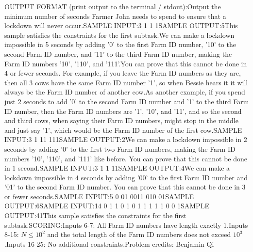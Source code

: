 \documentclass[12pt]{article}
\begin{document}
OUTPUT FORMAT (print output to the terminal / stdout):Output the minimum number of seconds Farmer John needs to spend to ensure that a
lockdown will never occur.SAMPLE INPUT:3
1
1
1SAMPLE OUTPUT:5This sample satisfies the constraints for the first subtask.We can make a lockdown impossible in 5 seconds by adding '0' to the first Farm
ID number, '10' to the second Farm ID number, and '11' to the third Farm ID
number, making the Farm ID numbers '10', '110', and '111'.You can prove that this cannot be done in 4 or fewer seconds. For example, if
you leave the Farm ID numbers as they are, then all 3 cows have the same Farm ID
number '1', so when Bessie hears it it will always be the Farm ID number of
another cow.As another example, if you spend just 2 seconds to add '0' to the second Farm ID
number and '1' to the third Farm ID number, then the Farm ID numbers are '1',
'10', and '11', and so the second and third cows, when saying their Farm ID
numbers, might stop in the middle and just say '1', which would be the Farm ID
number of the first cow.SAMPLE INPUT:3
1
11
111SAMPLE OUTPUT:2We can make a lockdown impossible in 2 seconds by adding '0' to the first two
Farm ID numbers, making the Farm ID numbers '10', '110', and '111' like before.
You can prove that this cannot be done in 1 second.SAMPLE INPUT:3
1
1
11SAMPLE OUTPUT:4We can make a lockdown impossible in 4 seconds by adding '00' to the first Farm
ID number and '01' to the second Farm ID number. You can prove that this cannot
be done in 3 or fewer seconds.SAMPLE INPUT:5
0
01
0011
010
01SAMPLE OUTPUT:6SAMPLE INPUT:14
0
1
1
0
1
0
1
1
1
1
1
0
0
1SAMPLE OUTPUT:41This sample satisfies the constraints for the first subtask.SCORING:Inputs 6-7: All Farm ID numbers have length exactly $1$.Inputs 8-15: $N\le 10^2$ and the total length of the Farm ID numbers does
not exceed $10^3$.Inputs 16-25: No additional constraints.Problem credits: Benjamin Qi
\end{document}
